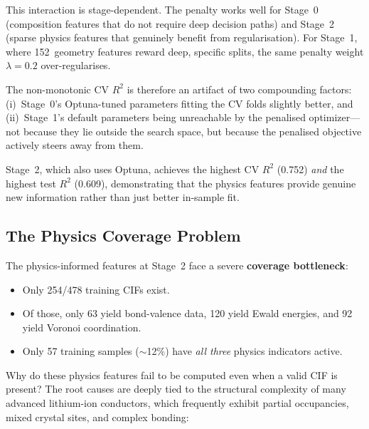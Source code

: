 \documentclass[11pt,a4paper]{article}
\newcommand{\Rtwo}{R^{2}}
\begin{document}
This interaction is stage-dependent.  The penalty works well for Stage~0
(composition features that do not require deep decision paths) and Stage~2
(sparse physics features that genuinely benefit from regularisation).
For Stage~1, where 152~geometry features reward deep, specific splits,
the same penalty weight $\lambda = 0.2$ over-regularises.

The non-monotonic CV $\Rtwo$ is therefore an artifact of two compounding
factors: (i)~Stage~0's Optuna-tuned parameters fitting the CV folds slightly
better, and (ii)~Stage~1's default parameters being unreachable by the
penalised optimizer---not because they lie outside the search space, but
because the penalised objective actively steers away from them.

Stage~2, which also uses Optuna, achieves the highest CV $\Rtwo$ (0.752)
\emph{and} the highest test $\Rtwo$ (0.609), demonstrating that the physics
features provide genuine new information rather than just better in-sample fit.

\subsection{The Physics Coverage Problem}
\label{sec:coverage}

The physics-informed features at Stage~2 face a severe \textbf{coverage
      bottleneck}:

\begin{itemize}[leftmargin=*]
      \item Only 254/478 training CIFs exist.
      \item Of those, only 63 yield bond-valence data, 120 yield Ewald energies,
            and 92 yield Voronoi coordination.
      \item Only 57 training samples ($\sim$12\%) have \emph{all three} physics
            indicators active.
\end{itemize}

Why do these physics features fail to be computed even when a valid CIF is present? The root causes are deeply tied to the structural complexity of many advanced lithium-ion conductors, which frequently exhibit partial occupancies, mixed crystal sites, and complex bonding:
\end{document}

